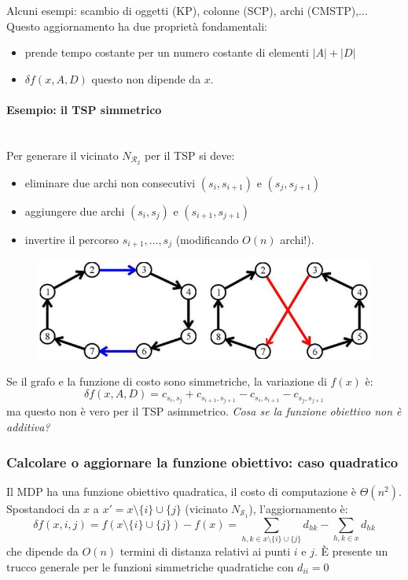 \documentclass{article}
\begin{document}
Alcuni esempi: scambio di oggetti (KP), colonne (SCP), archi (CMSTP),$\dots$
Questo aggiornamento ha due proprietà fondamentali:
\begin{itemize}
    \item prende tempo costante per un numero costante di elementi $|A|+|D|$
    \item $\delta f(x,A,D)$ questo non dipende da $x$.
\end{itemize}

\paragraph{Esempio: il TSP simmetrico}\mbox{}\\
Per generare il vicinato $N_{\mathcal{R}_2}$ per il TSP si deve:
\begin{itemize}
    \item eliminare due archi non consecutivi $(s_i,s_{i+1})$ e $(s_j,s_{j+1})$
    \item aggiungere due archi $(s_i,s_j)$ e $(s_{i+1},s_{j+1})$
    \item invertire il percorso $s_{i+1},\dots, s_j$ (modificando $O(n)$ archi!).
\end{itemize}
\begin{figure}[H]
    \centering
    \includegraphics[scale=0.5]{images/lez14_0.png}
\end{figure}
Se il grafo e la funzione di costo sono simmetriche, la variazione di $f(x)$ è:
$$\delta f(x,A,D)=c_{s_i,s_j}+c_{s_{i+1},s_{j+1}} - c_{s_i,s_{i+1}}-c_{s_j,s_{j+1}}$$
ma questo non è vero per il TSP asimmetrico. \textit{Cosa se la funzione obiettivo non è additiva?}

\subsubsection{Calcolare o aggiornare la funzione obiettivo: caso quadratico}
Il MDP ha una funzione obiettivo quadratica, il costo di computazione è $\Theta(n^2)$. Spostandoci
da $x$ a $x'=x\setminus \{i\}\cup\{j\}$ (vicinato $N_{\mathcal{S}_1}$), l'aggiornamento è:
$$\delta f(x,i,j)=f(x\setminus \{i\}\cup\{j\})-f(x)=\sum_{h,k\in x\setminus\{i\}\cup\{j\}} d_{hk} -\sum_{h,k\in x}d_{hk}$$
che dipende da $O(n)$ termini di distanza relativi ai punti $i$ e $j$. È presente un trucco generale
per le funzioni simmetriche quadratiche con $d_{ii}=0$
\end{document}
